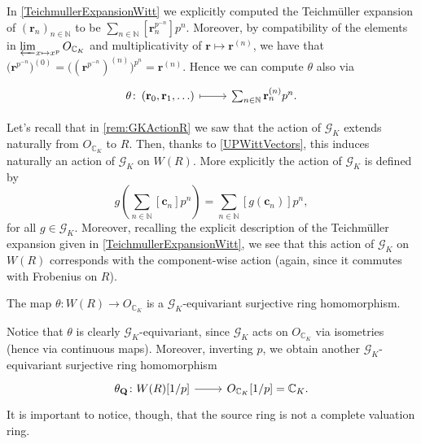\begin{rem}[]
	In \cref{TeichmullerExpansionWitt} we explicitly computed the Teichmüller
	expansion of $\left( \mathbf{r}_n \right)_{n \in \mathbb{N}}$
	to be $\sum_{n \in \mathbb{N} }^{  } [\mathbf{r}_n^{p^{-n}}] p^n$.
	Moreover, by compatibility of the elements in $\varprojlim_{x \mapsto x^p} O_{\mathbb{C}_K}$
	and multiplicativity of $\mathbf{r} \mapsto \mathbf{r}^{(n)}$,
	we have that $\big( \mathbf{r}^{p^{-n}} \big)^{(0)} = \big( (\mathbf{r}^{p^{-n}})^{(n)} \big)^{p^n} =
	\mathbf{r}^{(n)}$.
	Hence we can compute $\theta$ also via
	\begin{equation*}
	\begin{tikzcd}
		\theta\colon 
		\left( \mathbf{r}_0, \mathbf{r}_1, \ldots \right)
		\arrow[r, "", mapsto] &
		\sum_{n \in \mathbb{N} }^{  } \mathbf{r}_n^{(n)} p^n
	.\end{tikzcd}
	\end{equation*}
\end{rem}


\begin{rem}[]\label{GKActionWR}
	Let's recall that in \cref{rem:GKActionR} we saw that
	the action of $\mathscr{G}_K$ extends naturally from $O_{\mathbb{C}_K}$ to $R$.
	Then, thanks to \cref{UPWittVectors}, this induces naturally
	an action of $\mathscr{G}_K$ on $W(R)$.
	More explicitly the action of $\mathscr{G}_K$ is defined by
	\begin{equation*}
		g \left( \sum_{n \in \mathbb{N} }^{  } [\mathbf{c}_n] p^n \right) =
		\sum_{n \in \mathbb{N} }^{  } [g(\mathbf{c}_n)] p^n
	,\end{equation*}
	for all $g \in \mathscr{G}_K$.
	Moreover, recalling the explicit description of the Teichmüller
	expansion given in \cref{TeichmullerExpansionWitt}, we see that this
	action of $\mathscr{G}_K$ on $W(R)$ corresponds with the component-wise action
	(again, since it commutes with Frobenius on $R$).
\end{rem}


\begin{lem}
	The map $\theta\colon W(R) \to O_{\mathbb{C}_K}$ is a
	$\mathscr{G}_K$-equivariant surjective ring homomorphism.
\end{lem} 


\begin{rem}[]
	Notice that $\theta$ is clearly $\mathscr{G}_K$-equivariant,
	since $\mathscr{G}_K$ acts on $O_{\mathbb{C}_K}$
	via isometries (hence via continuous maps).
	Moreover, inverting $p$, we obtain another $\mathscr{G}_K$-equivariant surjective ring homomorphism
	\begin{equation*}
	\begin{tikzcd}[row sep = 0ex
		,/tikz/column 1/.append style={anchor=base east}
		,/tikz/column 2/.append style={anchor=base west}]
		\theta_{\mathbf{Q}}\colon W(R)[1/p] \arrow[r, "", rightarrow] &
		O_{\mathbb{C}_K}[1/p] = \mathbb{C}_K
	.\end{tikzcd}
	\end{equation*} 
	It is important to notice, though, that the source ring is not a complete valuation ring.
\end{rem}


